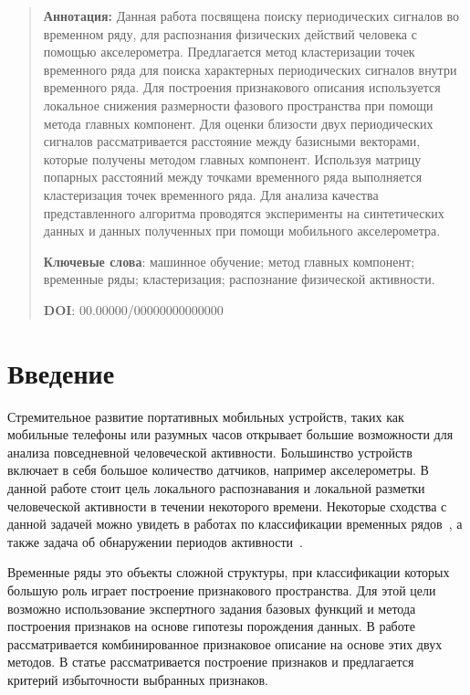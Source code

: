 \documentclass[12pt, twoside]{article}
\begin{document}
{\centering\begin{quote}
\textbf{Аннотация:} Данная работа посвящена поиску периодических сигналов во временном ряду, для распознания физических действий человека с помощью акселерометра. Предлагается метод кластеризации точек временного ряда для поиска характерных периодических сигналов внутри временного ряда. Для построения признакового описания используется локальное снижения размерности фазового пространства при помощи метода главных компонент. Для оценки близости двух периодических сигналов рассматривается расстояние между базисными векторами, которые получены методом главных компонент. Используя матрицу попарных расстояний между точками временного ряда выполняется кластеризация точек временного ряда. Для анализа качества представленного алгоритма проводятся эксперименты на синтетических данных и данных полученных при помощи мобильного акселерометра.


\smallskip
\textbf{Ключевые слова}: машинное обучение; метод главных компонент; временные ряды; кластеризация; распознание физической активности.

\smallskip
\textbf{DOI}: 00.00000/00000000000000
\end{quote}
}

\section{Введение}
Стремительное развитие портативных мобильных устройств, таких как мобильные телефоны или разумных часов открывает большие возможности для анализа повседневной человеческой активности. Большинство устройств включает в себя большое количество датчиков, например акселерометры. В данной работе стоит цель локального распознавания и локальной разметки человеческой активности в течении некоторого времени. Некоторые сходства с данной задачей можно увидеть в работах по классификации временных рядов~\cite{Ignatov2015}, а также задача об обнаружении периодов активности~\cite{Olivares2012, cinar2018}.

Временные ряды это объекты сложной структуры, при классификации которых большую роль играет построение признакового пространства. Для этой цели возможно использование экспертного задания базовых функций и метода построения признаков на основе гипотезы порождения данных. В работе \cite{Ivkin2015} рассматривается комбинированное признаковое описание на основе этих двух методов. В статье \cite{Katrutsa2015} рассматривается построение признаков и предлагается критерий избыточности выбранных признаков.
\end{document}
